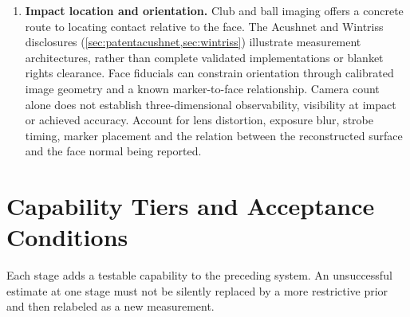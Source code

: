 \begin{enumerate}
A shared forward/inverse software module still requires independent validation; algebraic consistency alone is insufficient.
\item \textbf{Impact location and orientation.}
Club and ball imaging offers a concrete route to locating contact relative to the face.
The Acushnet and Wintriss disclosures (\cref{sec:patentacushnet,sec:wintriss}) illustrate measurement architectures, rather than complete validated implementations or blanket rights clearance.
Face fiducials can constrain orientation through calibrated image geometry and a known marker-to-face relationship.
Camera count alone does not establish three-dimensional observability, visibility at impact or achieved accuracy.
Account for lens distortion, exposure blur, strobe timing, marker placement and the relation between the reconstructed surface and the face normal being reported.
\end{enumerate}

\section{Capability Tiers and Acceptance Conditions}

Each stage adds a testable capability to the preceding system.
An unsuccessful estimate at one stage must not be silently replaced by a more restrictive prior and then relabeled as a new measurement.

